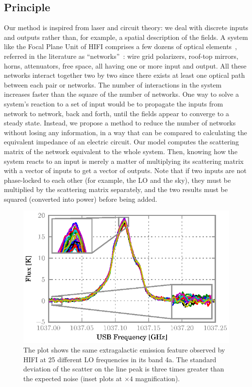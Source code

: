 \documentclass[journal]{IEEEtran}
\begin{document}
\subsection{Principle}
Our method is inspired from laser and circuit theory: we deal with discrete inputs and outputs rather than, for example, a spatial description of the fields.
A system like the Focal Plane Unit of HIFI comprises a few dozens of optical elements~\cite{jackson2002hifi}, referred in the literature as ``networks''~\cite{siegman1986lasers}: wire grid polarizers, roof-top mirrors, horns, attenuators, free space, all having one or more input and output.
All these networks interact together two by two since there exists at least one optical path between each pair or networks.
The number of interactions in the system increases faster than the square of the number of networks.
One way to solve a system's reaction to a set of input would be to propagate the inputs from network to network, back and forth, until the fields appear to converge to a steady state.
Instead, we propose a method to reduce the number of networks without losing any information, in a way that can be compared to calculating the equivalent impedance of an electric circuit.
Our model computes the scattering matrix of the network equivalent to the whole system.
Then, knowing how the system reacts to an input is merely a matter of multiplying its scattering matrix with a vector of inputs to get a vector of outputs.
Note that if two inputs are not phase-locked to each other (for example, the LO and the sky), they must be multiplied by the scattering matrix separately, and the two results must be squared (converted into power) before being added.

\begin{figure}
    \centering
    \includegraphics{obsid_5000352C}
    \caption{
    The plot shows the same extragalactic emission feature observed by HIFI at 25 different LO frequencies in its band 4a.
    The standard deviation of the scatter on the line peak is three times greater than the expected noise (inset plots at $\times 4$ magnification).
    }%
    \label{fig:scatter_real_data}
\end{figure}
\end{document}
